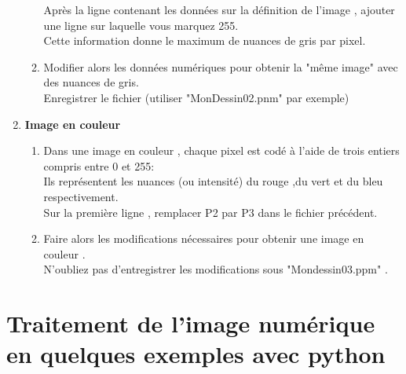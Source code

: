 \documentclass[10pt,fleqn]{article} %
\begin{document}
\begin{enumerate}
\begin{enumerate}
			Après la ligne contenant les données sur la définition de l'image , ajouter une ligne sur laquelle vous marquez 255.\\
			
			
			Cette information donne le maximum de nuances de gris par pixel.
			
			\medskip
			
			\item Modifier alors les données numériques pour obtenir la "même image" avec des nuances de gris.\\
			
			
			Enregistrer le fichier (utiliser "MonDessin02.pnm" par exemple)
		\end{enumerate}
	
	
	\medskip
	
		
	\item  \textbf{Image en couleur}
	
	\medskip
	
	
		\begin{enumerate}
			\item Dans une image en couleur , chaque pixel est codé à l'aide de trois entiers compris entre 0 et 255:\\
			
			
			Ils représentent les nuances (ou intensité) du rouge ,du vert et du bleu respectivement.\\
			
			
			Sur la première ligne , remplacer P2 par P3 dans le fichier précédent.
			
			\medskip
			
			\item Faire alors les modifications nécessaires pour obtenir une image en couleur .\\
			
			
			N'oubliez pas d'entregistrer les modifications sous "Mondessin03.ppm" .
			
		\end{enumerate}
	\end{enumerate}

\section{Traitement de l'image numérique en quelques exemples avec python}
\end{document}
